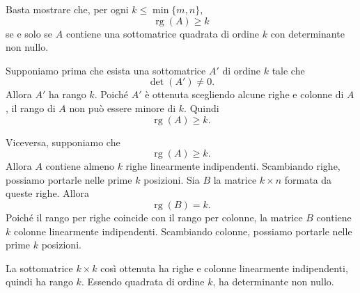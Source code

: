 \documentclass[a4paper]{article}
\begin{document}
\begin{snippetproof}{}
    Basta mostrare che, per ogni \(k\leq \min\{m,n\}\),
    \[
        \operatorname{rg}(A)\geq k
    \]
    se e solo se \(A\) contiene una sottomatrice quadrata di ordine \(k\) con determinante non nullo.

    Supponiamo prima che esista una sottomatrice \(A'\) di ordine \(k\) tale che
    \[
        \det(A')\neq 0.
    \]
    Allora \(A'\) ha rango \(k\). Poiché \(A'\) è ottenuta scegliendo alcune righe e colonne di \(A\), il rango di \(A\) non può essere minore di \(k\). Quindi
    \[
        \operatorname{rg}(A)\geq k.
    \]

    Viceversa, supponiamo che
    \[
        \operatorname{rg}(A)\geq k.
    \]
    Allora \(A\) contiene almeno \(k\) righe linearmente indipendenti. Scambiando righe, possiamo portarle nelle prime \(k\) posizioni. Sia \(B\) la matrice \(k\times n\) formata da queste righe. Allora
    \[
        \operatorname{rg}(B)=k.
    \]
    Poiché il rango per righe coincide con il rango per colonne, la matrice \(B\) contiene \(k\) colonne linearmente indipendenti. Scambiando colonne, possiamo portarle nelle prime \(k\) posizioni.

    La sottomatrice \(k\times k\) così ottenuta ha righe e colonne linearmente indipendenti, quindi ha rango \(k\). Essendo quadrata di ordine \(k\), ha determinante non nullo.
\end{snippetproof}
\end{document}
